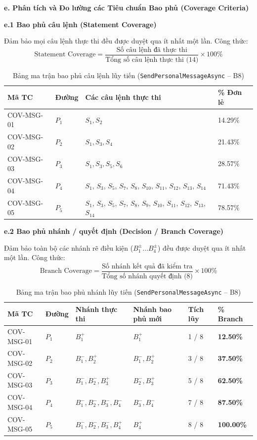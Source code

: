 \documentclass[11pt,a4paper]{article}
\begin{document}
\noindent\textbf{e. Phân tích và Đo lường các Tiêu chuẩn Bao phủ (Coverage Criteria)}

\noindent\textbf{e.1 Bao phủ câu lệnh (Statement Coverage)}

\noindent Đảm bảo mọi câu lệnh thực thi đều được duyệt qua ít nhất một lần. Công thức:
\[
\text{Statement Coverage} = \frac{\text{Số câu lệnh đã thực thi}}{\text{Tổng số câu lệnh thực thi (14)}} \times 100\%
\]

\begin{table}[H]
\centering
\small
\begin{tabularx}{\textwidth}{|L{2.5cm}|C{1.4cm}|X|C{2.2cm}|}
\hline
{}
\textbf{Mã TC} & \textbf{Đường} & \textbf{Các câu lệnh thực thi} & \textbf{\% Đơn lẻ} \tabularnewline
\hline
COV-MSG-01 & $P_1$ & $S_1, S_2$ & 14.29\% \\ \hline
COV-MSG-02 & $P_2$ & $S_1, S_3, S_4$ & 21.43\% \\ \hline
COV-MSG-03 & $P_3$ & $S_1, S_3, S_5, S_6$ & 28.57\% \\ \hline
COV-MSG-04 & $P_4$ & $S_1$, $S_3$, $S_5$, $S_7$, $S_8$, $S_{10}$, $S_{11}$, $S_{12}$, $S_{13}$, $S_{14}$ & 71.43\% \\ \hline
COV-MSG-05 & $P_5$ & $S_1$, $S_3$, $S_5$, $S_7$, $S_8$, $S_9$, $S_{10}$, $S_{11}$, $S_{12}$, $S_{13}$, $S_{14}$ & 78.57\% \\ \hline
\end{tabularx}
\caption{Bảng ma trận bao phủ câu lệnh lũy tiến (\texttt{SendPersonalMessageAsync} -- B8)}
\end{table}

\noindent\textbf{e.2 Bao phủ nhánh / quyết định (Decision / Branch Coverage)}

\noindent Đảm bảo toàn bộ các nhánh rẽ điều kiện ($B_1^\pm \dots B_4^\pm$) đều được duyệt qua ít nhất một lần. Công thức:
\[
\text{Branch Coverage} = \frac{\text{Số nhánh kết quả đã kiểm tra}}{\text{Tổng số nhánh quyết định (8)}} \times 100\%
\]

\begin{table}[H]
\centering
\small
\begin{tabularx}{\textwidth}{|L{2.3cm}|C{1.2cm}|L{3.2cm}|X|C{1.6cm}|C{1.9cm}|}
\hline
{}
\textbf{Mã TC} & \textbf{Đường} & \textbf{Nhánh thực thi} & \textbf{Nhánh bao phủ mới} & \textbf{Tích lũy} & \textbf{\% Branch} \tabularnewline
\hline
COV-MSG-01 & $P_1$ & $B_1^+$ & $B_1^+$ & 1 / 8 & \textbf{12.50\%} \\ \hline
COV-MSG-02 & $P_2$ & $B_1^-, B_2^+$ & $B_1^-, B_2^+$ & 3 / 8 & \textbf{37.50\%} \\ \hline
COV-MSG-03 & $P_3$ & $B_1^-, B_2^-, B_3^+$ & $B_2^-, B_3^+$ & 5 / 8 & \textbf{62.50\%} \\ \hline
COV-MSG-04 & $P_4$ & $B_1^-, B_2^-, B_3^-, B_4^-$ & $B_3^-, B_4^-$ & 7 / 8 & \textbf{87.50\%} \\ \hline
COV-MSG-05 & $P_5$ & $B_1^-, B_2^-, B_3^-, B_4^+$ & $B_4^+$ & 8 / 8 & \textbf{100.00\%} \\ \hline
\end{tabularx}
\caption{Bảng ma trận bao phủ nhánh lũy tiến (\texttt{SendPersonalMessageAsync} -- B8)}
\end{table}
\end{document}
